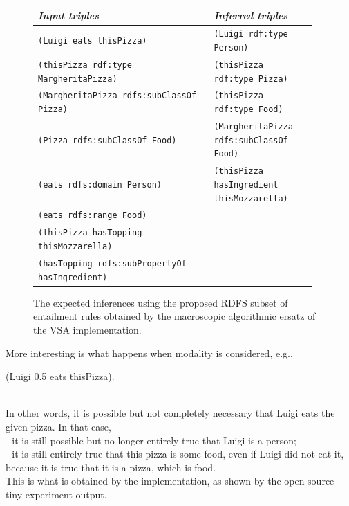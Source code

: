\documentclass[sn-mathphys]{sn-jnl}
\begin{document}
\begin{figure}[htbp]
\begin{center}\begin{tabular}{| p{0.60\linewidth} | p{0.35\linewidth} |}
    {\em Input triples}                            & {\em Inferred triples} \\
\hline
  {\small\tt (Luigi eats thisPizza)}                      & {\small\tt (Luigi rdf:type Person)} \\
  {\small\tt (thisPizza rdf:type MargheritaPizza)}        & {\small\tt (thisPizza rdf:type Pizza)} \\
  {\small\tt (MargheritaPizza rdfs:subClassOf Pizza)}      & {\small\tt (thisPizza rdf:type Food)} \\
  {\small\tt (Pizza rdfs:subClassOf Food)}                & {\small\tt (MargheritaPizza rdfs:subClassOf Food)} \\
  {\small\tt (eats rdfs:domain Person)}                   &  {\small\tt (thisPizza hasIngredient thisMozzarella)}\\
  {\small\tt (eats rdfs:range Food)}                      &\\
  {\small\tt (thisPizza hasTopping thisMozzarella)}       &\\
  {\small\tt (hasTopping rdfs:subPropertyOf hasIngredient)} &\\
  \hline \end{tabular}\end{center}
\caption{The expected inferences using the proposed RDFS subset of entailment rules obtained by
  the macroscopic algorithmic ersatz of the VSA implementation.}
\label{result0}
\end{figure}

More interesting is what happens when modality is considered, e.g.,
\\\centerline{(Luigi 0.5 eats thisPizza).}\\
In other words, it is possible but not completely necessary that Luigi eats the given pizza. In that case,
\\- it is still possible but no longer entirely true that Luigi is a person;
\\- it is still entirely true that this pizza is some food, even if Luigi did not eat it, because it is true that it is a pizza, which is food.
\\ This is what is obtained by the implementation, as shown by the open-source tiny experiment output.
\end{document}
